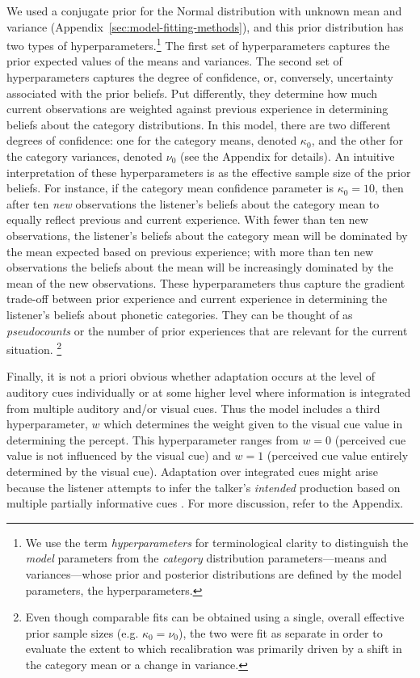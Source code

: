 We used a conjugate prior for the Normal distribution with unknown mean and variance (Appendix~\ref{sec:model-fitting-methods}), and this prior distribution has two types of hyperparameters.\footnote{We use the term {\em hyperparameters} for terminological clarity to distinguish the \emph{model} parameters from the \emph{category} distribution parameters---means and variances---whose prior and posterior distributions are defined by the model parameters, the hyperparameters.}  The first set of hyperparameters captures the prior expected values of the means and variances.  The second set of hyperparameters captures the degree of confidence, or, conversely, uncertainty associated with the prior beliefs.  Put differently, they determine how much current observations are weighted against previous experience in determining beliefs about the category distributions.  In this model, there are two different degrees of confidence: one for the category means, denoted $\kappa_0$, and the other for the category variances, denoted $\nu_0$ (see the Appendix %
for details).
An intuitive interpretation of these hyperparameters is as the effective sample size of the prior beliefs.  For instance, if the category mean confidence parameter is $\kappa_0 = 10$, then after ten \emph{new} observations the listener's beliefs about the category mean to equally reflect previous and current experience.  With fewer than ten new observations, the listener's beliefs about the category mean will be dominated by the mean expected based on previous experience; with more than ten new observations the beliefs about the mean will be increasingly dominated by the mean of the new observations.  These hyperparameters thus capture the gradient trade-off between prior experience and current experience in determining the listener's beliefs about phonetic categories.  They can be thought of as {\em pseudocounts} or the number of prior experiences that are relevant for the current situation.
\footnote{Even though comparable fits can be obtained using a single, overall effective prior sample sizes (e.g. $\kappa_0=\nu_0$), the two were fit as separate in order to evaluate the extent to which recalibration was primarily driven by a shift in the category mean or a change in variance.}

Finally, it is not a priori obvious whether adaptation occurs at the level of auditory cues individually or at some higher level where information is integrated from multiple auditory and/or visual cues.  Thus the model includes a third hyperparameter, $w$ which determines the weight given to the visual cue value in determining the percept.  This hyperparameter ranges from $w=0$ (perceived cue value is not influenced by the visual cue) and $w=1$ (perceived cue value entirely determined by the visual cue).  Adaptation over integrated cues might arise because the listener attempts to infer the talker's \emph{intended} production based on multiple partially informative cues \autocite[including top-down category distribution information,][]{Feldman2009a}.  For more discussion, refer to the Appendix. %

